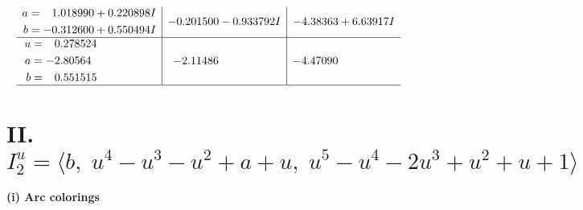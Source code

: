 \documentclass[1p]{elsarticle_modified}
\theoremstyle{definition}
\begin{document}
$$\begin{array}{c|c|c}
\begin{aligned}
a &= \phantom{-}1.018990 + 0.220898 I \\
b &= -0.312600 + 0.550494 I\end{aligned}
 & -0.201500 - 0.933792 I & -4.38363 + 6.63917 I \\ \hline\begin{aligned}
u &= \phantom{-}0.278524\phantom{ +0.000000I} \\
a &= -2.80564\phantom{ +0.000000I} \\
b &= \phantom{-}0.551515\phantom{ +0.000000I}\end{aligned}
 & -2.11486\phantom{ +0.000000I} & -4.47090\phantom{ +0.000000I}\\
 \hline 
 \end{array}$$\newpage\newpage\renewcommand{\arraystretch}{1}
\centering \section*{II. $I^u_{2}= \langle b,\;u^4- u^3- u^2+a+u,\;u^5- u^4-2 u^3+u^2+u+1 \rangle$}
\flushleft \textbf{(i) Arc colorings}\\
\end{document}

